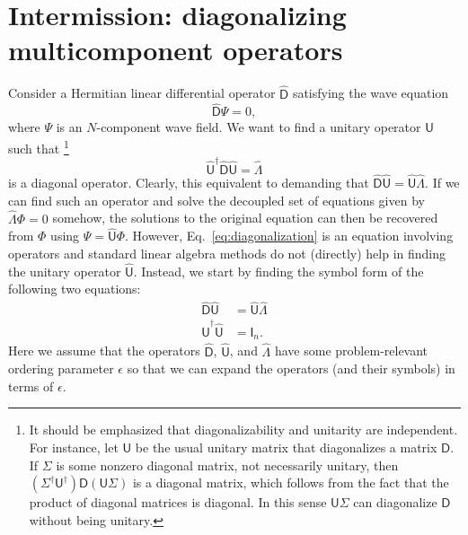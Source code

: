 \section{Intermission: diagonalizing multicomponent operators}

Consider a Hermitian linear differential operator $\widehat{\mathsf{D}}$ satisfying the wave equation
%
\begin{equation}
  \widehat{\mathsf{D}}\Psi = 0,
\end{equation}
%
where $\Psi$ is an $N$-component wave field.
%
We want to find a unitary operator ${\mathsf{U}}$ such that%
\footnote{It should be emphasized that diagonalizability and unitarity are independent. For instance, let $\mathsf{U}$ be the usual unitary matrix that diagonalizes a matrix $\mathsf{D}$.
  If $\Sigma$ is some nonzero diagonal matrix, not necessarily unitary, then $(\Sigma^{\dagger}\mathsf{U}^{\dagger})\mathsf{D}(\mathsf{U}\Sigma)$ is a diagonal matrix, which follows from the fact that the product of diagonal matrices is diagonal.
  In this sense $\mathsf{U}\Sigma$ can diagonalize $\mathsf{D}$ without being unitary.}
%
\begin{equation}
  \widehat{\mathsf{U}}^{\dagger}\widehat{\mathsf{D}}\widehat{\mathsf{U}} = \widehat{\Lambda}\label{eq:diagonalization}
\end{equation}
%
is a diagonal operator.
Clearly, this equivalent to demanding that $\widehat{\mathsf{D}}\widehat{\mathsf{U}} = \widehat{\mathsf{U}}\widehat{\Lambda}$.
If we can find such an operator and solve the decoupled set of equations given by $\widehat{\Lambda}\Phi = 0$ somehow,
the solutions to the original equation can then be recovered from $\Phi$ using $\Psi = \widehat{\mathsf{U}}\Phi$.
However, Eq.~\eqref{eq:diagonalization} is an equation involving operators and standard linear algebra methods do not (directly) help in finding the unitary operator $\widehat{\mathsf{U}}$.
Instead, we start by finding the symbol form of the following two equations:
%
\begin{equation}
  \begin{aligned}
    \widehat{\mathsf{D}}\widehat{\mathsf{U}} &= \widehat{\mathsf{U}}\widehat{\Lambda}\\
    \widehat{\mathsf{U}}^{\dagger}\widehat{\mathsf{U}} &= \mathsf{I}_{n}.
  \end{aligned}
  \label{eq:diagonal2}
\end{equation}
%
Here we assume that the operators $\widehat{\mathsf{D}}$, $\widehat{\mathsf{U}}$, and $\widehat{\Lambda}$ have some problem-relevant ordering parameter $\epsilon$ so that we can expand the operators (and their symbols) in terms of $\epsilon$.%
